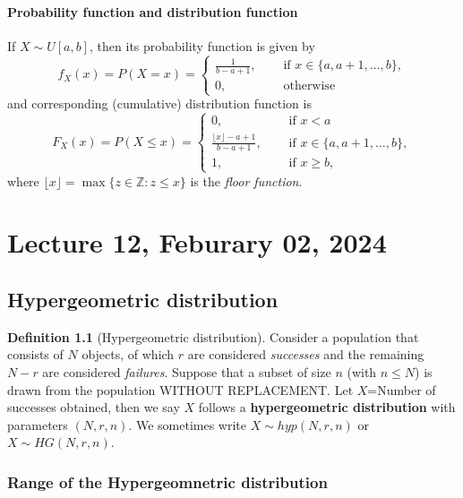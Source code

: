 \documentclass[
]{book}
\theoremstyle{definition}
\newtheorem{definition}{Definition}[chapter]
\theoremstyle{definition}
\theoremstyle{definition}
\theoremstyle{definition}
\theoremstyle{remark}
\begin{document}
\subsubsection{Probability function and distribution function}\label{probability-function-and-distribution-function}

If \(X \sim U[a,b]\), then its probability function is given by
\[
   f_X(x)= P(X = x) = \begin{cases} \frac{1}{b - a + 1}, &\quad\text{ if }x \in\{a,a+1,\dots,b\}, \\ 0, &\quad\text{ otherwise} \end{cases}   \]
and corresponding (cumulative) distribution function is
\[
   F_X(x)= P(X \leq x) = \begin{cases} 0, &\quad\text{ if } x<a\\
   \frac{\lfloor x\rfloor - a + 1}{b - a + 1}, &\quad\text{ if }x \in\{a,a+1,\dots,b\}, \\ 
   1, &\quad\text{ if } x\geq b,\end{cases}   \]
where \(\lfloor x\rfloor=\max\{z\in\mathbb{Z}: z\leq x\}\) is the \emph{floor function}.

\chapter{Lecture 12, Feburary 02, 2024}\label{lecture-12-feburary-02-2024}

\section{Hypergeometric distribution}\label{hypergeometric-distribution}

\begin{definition}[Hypergeometric distribution]
Consider a population that consists of \(N\) objects, of which \(r\) are considered \emph{successes} and the remaining \(N-r\) are considered \emph{failures}. Suppose that a subset of size \(n\) (with \(n\leq N\)) is drawn from the population WITHOUT REPLACEMENT. Let \(X\)=Number of successes obtained, then we say \(X\) follows a \textbf{hypergeometric distribution} with parameters \((N,r,n)\). We sometimes write \(X \sim hyp(N,r,n)\) or \(X\sim HG(N,r,n)\).
\end{definition}

\subsection{Range of the Hypergeomnetric distribution}\label{range-of-the-hypergeomnetric-distribution}
\end{document}
